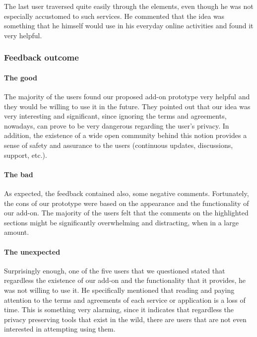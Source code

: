 The last user traversed quite easily through the elements, even though he was 
not especially accustomed to such services. He commented that the idea was 
something that he himself would use in his everyday online activities and found 
it very helpful.

\subsubsection{Feedback outcome}

\paragraph{The good}

The majority of the users found our proposed add-on prototype very helpful and 
they would be willing to use it in the future. They pointed out that our idea 
was very interesting and significant, since ignoring the terms and agreements, 
nowadays, can prove to be very dangerous regarding the user's privacy. In 
addition, the existence of a wide open community behind this notion provides a 
sense of safety and assurance to the users (continuous updates, discussions, 
support, etc.). 

\paragraph{The bad}

As expected, the feedback contained also, some negative comments. Fortunately, 
the cons of our prototype were based on the appearance and the functionality of 
our add-on. The majority of the users felt that the comments on the highlighted 
sections might be significantly overwhelming and distracting, when in a large 
amount. 

\paragraph{The unexpected}

Surprisingly enough, one of the five users that we questioned stated that 
regardless the existence of our add-on and the functionality that it provides, 
he was not willing to use it. 
He specifically mentioned that reading and paying attention to the terms and 
agreements of each service or application is a loss of time. This is something 
very alarming, since it indicates that regardless the privacy preserving tools 
that exist in the wild, there are users that are not even interested in 
attempting using them.

